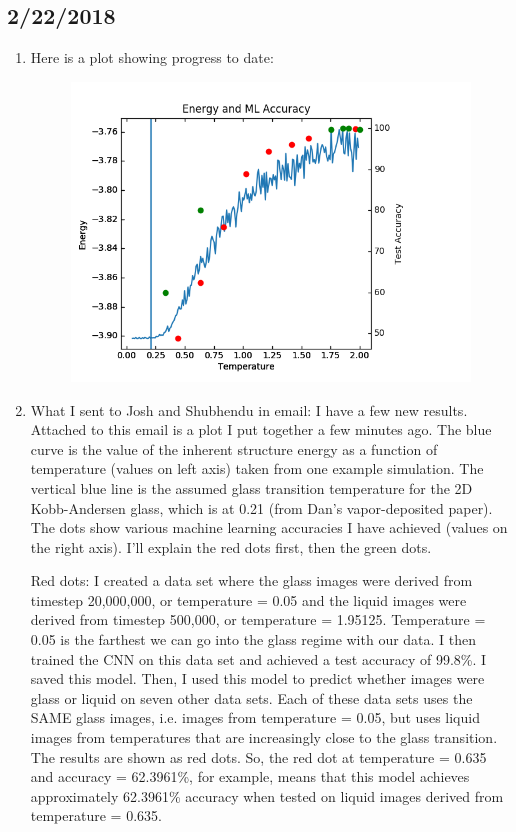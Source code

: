 \documentclass[12pt,reqno]{amsart}
\numberwithin{equation}{section}
\begin{document}
\subsection{2/22/2018}
\begin{enumerate}
\item Here is a plot showing progress to date:

\begin{figure}[H]
\centering
\includegraphics[scale=0.6]{progress-plot}
\end{figure}

\item What I sent to Josh and Shubhendu in email:
I have a few new results.  Attached to this email is a plot I put together a few minutes ago.  The blue curve is the value of the inherent structure energy as a function of temperature (values on left axis) taken from one example simulation.  The vertical blue line is the assumed glass transition temperature for the 2D Kobb-Andersen glass, which is at 0.21 (from Dan's vapor-deposited paper).  The dots show various machine learning accuracies I have achieved (values on the right axis).  I'll explain the red dots first, then the green dots.  

Red dots:
I created a data set where the glass images were derived from timestep 20,000,000, or temperature = 0.05 and the liquid images were derived from timestep 500,000, or temperature = 1.95125.  Temperature = 0.05 is the farthest we can go into the glass regime with our data.  I then trained the CNN on this data set and achieved a test accuracy of 99.8\%.  I saved this model.  Then, I used this model to predict whether images were glass or liquid on seven other data sets.  Each of these data sets uses the SAME glass images, i.e. images from temperature = 0.05, but uses liquid images from temperatures that are increasingly close to the glass transition.  The results are shown as red dots.  So, the red dot at temperature = 0.635 and accuracy = 62.3961\%, for example, means that this model achieves approximately 62.3961\% accuracy when tested on liquid images derived from temperature = 0.635.    


\end{enumerate}
\end{document}
